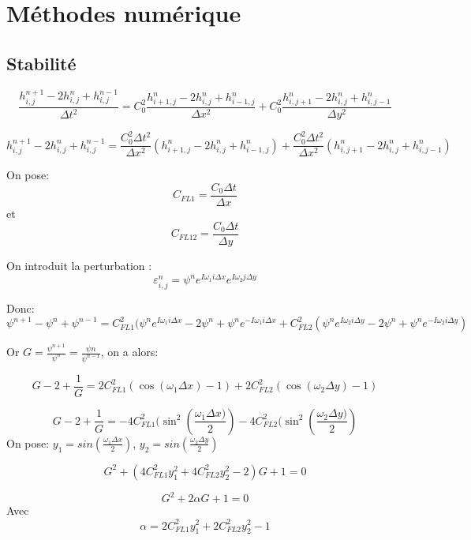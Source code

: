 \documentclass[a4paper,10pt]{report} %
\begin{document}
\chapter{Méthodes numérique} 
\section{Stabilité}

\begin{equation}\frac{h^{n+1}_{i,j}-2h^{n}_{i,j}+h^{n-1}_{i,j}}{\Delta t^{2}}=C^{2}_{0}\frac{h^{n}_{i+1,j}-2h^{n}_{i,j}+h^{n}_{i-1,j}}{\Delta x^{2}}+C^{2}_{0}\frac{h^{n}_{i,j+1}-2h^{n}_{i,j}+h^{n}_{i,j-1}}{\Delta y^{2}}
\end{equation}

\begin{equation}h^{n+1}_{i,j}-2h^{n}_{i,j}+h^{n-1}_{i,j}=\frac{C^{2}_{0}\Delta t^{2}}{\Delta x^{2}}(h^{n}_{i+1,j}-2h^{n}_{i,j}+h^{n}_{i-1,j})+\frac{C^{2}_{0}\Delta t^{2}}{\Delta x^{2}}(h^{n}_{i,j+1}-2h^{n}_{i,j}+h^{n}_{i,j-1})
\end{equation}

On pose: $$C_{FL1}=\frac{C_{0}\Delta t}{\Delta x}$$ et$$C_{FL12}=\frac{C_{0}\Delta t}{\Delta y}$$

On introduit la perturbation : $$\varepsilon^{n}_{i,j}=\psi^{n}e^{I\omega_{1}i\Delta x}e^{I\omega_{2}j\Delta y}$$

Donc: \begin{equation}\psi^{n+1}-\psi^{n}+\psi^{n-1}=C_{FL1}^{2}(\psi^{n}e^{I\omega_{1}i\Delta x}-2\psi^{n}+\psi^{n}e^{-I\omega_{1}i\Delta x}+C_{FL2}^{2}(\psi^{n}e^{I\omega_{2}i\Delta y}-2\psi^{n}+\psi^{n}e^{-I\omega_{2}i\Delta y})
\end{equation}

Or $G=\frac{\psi^{n+1}}{\psi^{n}}=\frac{\psi{n}}{\psi^{n-1}}$, on a alors:

$$G-2+\frac{1}{G}=2C_{FL1}^{2}(\cos(\omega_{1}\Delta x)-1)+2C_{FL2}^{2}(\cos(\omega_{2}\Delta y)-1)$$

$$G-2+\frac{1}{G}=-4C_{FL1}^{2}(\sin^{2}(\frac{\omega_{1}\Delta x)}{2})-4C_{FL2}^{2}(\sin^{2}(\frac{\omega_{2}\Delta y)}{2})$$
On pose: $y_{1}=sin(\frac{\omega_{1}\Delta x}{2})$, $y_{2}=sin(\frac{\omega_{2}\Delta y}{2})$

\begin{equation}
G^{2}+(4C_{FL1}^{2}y_{1}^{2}+4C_{FL2}^{2}y_{2}^{2}-2)G+1=0
\end{equation}

\begin{equation}
G^{2}+2\alpha G+1=0
\end{equation}
Avec $$\alpha=2C_{FL1}^{2}y_{1}^{2}+2C_{FL2}^{2}y_{2}^{2}-1$$
\end{document}
